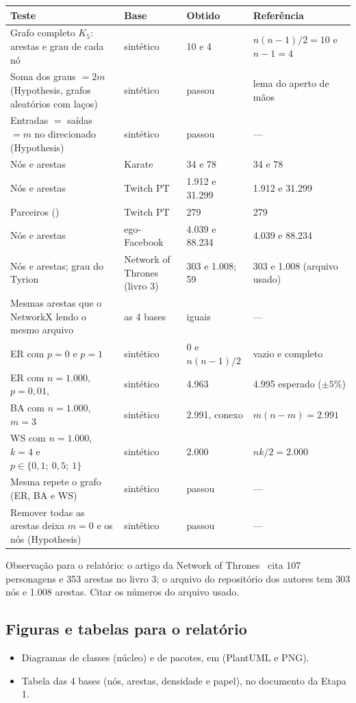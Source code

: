 {\small\begin{tabularx}{\linewidth}{@{}Y L{2.5cm} L{2.2cm} L{3.8cm}@{}}
\toprule
Teste & Base & Obtido & Referência \\
\midrule
Grafo completo $K_5$: arestas e grau de cada nó & sintético & 10 e 4 & $n(n-1)/2 = 10$ e $n-1 = 4$ \\
Soma dos graus $= 2m$ (Hypothesis, grafos aleatórios com laços) & sintético & passou & lema do aperto de mãos \\
Entradas $=$ saídas $= m$ no direcionado (Hypothesis) & sintético & passou & --- \\
Nós e arestas & Karate & 34 e 78 & 34 e 78~\cite{zachary1977} \\
Nós e arestas & Twitch PT & 1.912 e 31.299 & 1.912 e 31.299~\cite{rozemberczki2021} \\
Parceiros () & Twitch PT & 279 & 279 \\
Nós e arestas & ego-Facebook & 4.039 e 88.234 & 4.039 e 88.234~\cite{mcauley2012} \\
Nós e arestas; grau do Tyrion & Network of Thrones (livro 3) & 303 e 1.008; 59 & 303 e 1.008 (arquivo usado) \\
Mesmas arestas que o NetworkX lendo o mesmo arquivo & as 4 bases & iguais & --- \\
ER com $p = 0$ e $p = 1$ & sintético & 0 e $n(n-1)/2$ & vazio e completo \\
ER com $n = 1.000$, $p = 0{,}01$,  & sintético & 4.963 & 4.995 esperado ($\pm 5\%$) \\
BA com $n = 1.000$, $m = 3$ & sintético & 2.991, conexo & $m(n - m) = 2.991$ \\
WS com $n = 1.000$, $k = 4$ e $p \in \{0{,}1;\ 0{,}5;\ 1\}$ & sintético & 2.000 & $n k / 2 = 2.000$ \\
Mesma  repete o grafo (ER, BA e WS) & sintético & passou & --- \\
Remover todas as arestas deixa $m = 0$ e os nós (Hypothesis) & sintético & passou & --- \\
\bottomrule
\end{tabularx}}

\medskip
\noindent Observação para o relatório: o artigo da Network of Thrones~\cite{beveridge2016} cita
107 personagens e 353 arestas no livro 3; o arquivo do repositório dos autores tem 303 nós e
1.008 arestas. Citar os números do arquivo usado.

\subsection{Figuras e tabelas para o relatório}
\begin{itemize}[leftmargin=*]
  \item Diagramas de classes (núcleo) e de pacotes, em  (PlantUML e PNG). \feito
  \item Tabela das 4 bases (nós, arestas, densidade e papel), no documento da Etapa 1. \feito
\end{itemize}

